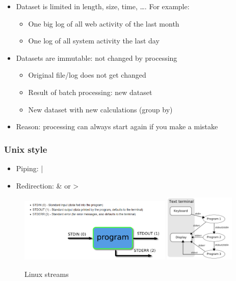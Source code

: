 \documentclass{article}
\begin{document}
\begin{itemize}
    \item Dataset is limited in length, size, time, \dots. For example:
    \begin{itemize}
        \item One big log of all web activity of the last month
        \item One log of all system activity the last day
    \end{itemize}
    \item Datasets are immutable: not changed by processing
    \begin{itemize}
        \item Original file/log does not get changed
        \item Result of batch processing: new dataset
        \item New dataset with new calculations (group by)
    \end{itemize}
    \item Reason: processing can always start again if you make a mistake
\end{itemize}

\subsubsection{Unix style}

\begin{itemize}
    \item Piping: |
    \item Redirection: \& or >
\end{itemize}

\begin{figure}[H]
    \centering
    \includegraphics[width=0.65\textwidth]{linux-std.png}
    \includegraphics[width=0.3\textwidth]{linux-std2.png}
    \caption{Linux streams}
\end{figure}
\end{document}
